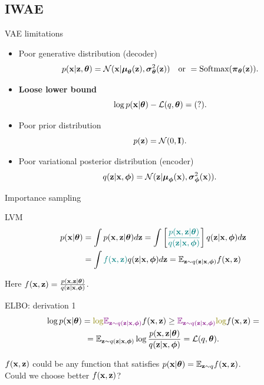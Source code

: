 \documentclass{beamer}
\begin{document}
\subsection{IWAE}
\begin{frame}{VAE limitations}
	\begin{itemize}
		\item Poor generative distribution (decoder)
		\[
			p(\mathbf{x} | \mathbf{z}, \boldsymbol{\theta}) = \mathcal{N}(\mathbf{x}| \boldsymbol{\mu}_{\boldsymbol{\theta}}(\mathbf{z}), \boldsymbol{\sigma}^2_{\boldsymbol{\theta}}(\mathbf{z})) \quad \text{or } = \text{Softmax}(\boldsymbol{\pi}_{\boldsymbol{\theta}}(\mathbf{z})).
		\]
		\item \textbf{Loose lower bound}
		\[
			\log p(\mathbf{x} | \boldsymbol{\theta}) - \mathcal{L}(q, \boldsymbol{\theta}) = (?).
		\]
		\item Poor prior distribution
		\[
			p(\mathbf{z}) = \mathcal{N}(0, \mathbf{I}).
		\]
		\item Poor variational posterior distribution (encoder)
		\[
			q(\mathbf{z} | \mathbf{x}, \boldsymbol{\phi}) = \mathcal{N}(\mathbf{z}| \boldsymbol{\mu}_{\boldsymbol{\phi}}(\mathbf{x}), \boldsymbol{\sigma}^2_{\boldsymbol{\phi}}(\mathbf{x})).
		\]
	\end{itemize}
\end{frame}
\begin{frame}{Importance sampling}
	\begin{block}{LVM}
		\vspace{-0.5cm}
		\begin{align*}
			p(\mathbf{x} | \boldsymbol{\theta}) &= \int p(\mathbf{x}, \mathbf{z} | \boldsymbol{\theta}) d\mathbf{z} = \int \left[{\color{teal}\frac{p(\mathbf{x}, \mathbf{z} | \boldsymbol{\theta})}{q(\mathbf{z} | \mathbf{x}, \boldsymbol{\phi})}} \right] q(\mathbf{z} | \mathbf{x}, \boldsymbol{\phi}) d\mathbf{z} \\
			&= \int {\color{teal}f(\mathbf{x}, \mathbf{z})} q(\mathbf{z} | \mathbf{x}, \boldsymbol{\phi}) d\mathbf{z} = \mathbb{E}_{\mathbf{z} \sim q(\mathbf{z} | \mathbf{x}, \boldsymbol{\phi})} f(\mathbf{x}, \mathbf{z})
		\end{align*}
	\end{block}
	Here $f(\mathbf{x}, \mathbf{z}) = \frac{p(\mathbf{x}, \mathbf{z} | \boldsymbol{\theta})}{q(\mathbf{z} | \mathbf{x}, \boldsymbol{\phi})}$.
	\begin{block}{ELBO: derivation 1}
		\vspace{-0.5cm}
		\begin{multline*}
			\log p(\bx | \btheta) = {\color{olive}\log} {\color{violet}\mathbb{E}_{\bz \sim q(\bz | \bx, \bphi)}} f(\bx, \bz)
			\geq {\color{violet}\mathbb{E}_{\bz \sim q(\bz | \bx, \bphi)}} {\color{olive}\log} f(\bx, \bz) = \\
			= \mathbb{E}_{\bz \sim q(\bz | \bx, \bphi)} \log \frac{p(\bx, \bz | \btheta)}{q(\bz | \bx, \bphi)} = \mathcal{L}(q, \btheta).
		\end{multline*}
	\end{block}
	$f(\mathbf{x}, \mathbf{z})$ could be any function that satisfies $p(\mathbf{x} | \boldsymbol{\theta})=\mathbb{E}_{\mathbf{z} \sim q} f(\mathbf{x}, \mathbf{z})$. \\
	Could we choose better $f(\mathbf{x}, \mathbf{z})$? 
\end{frame}
\end{document}
